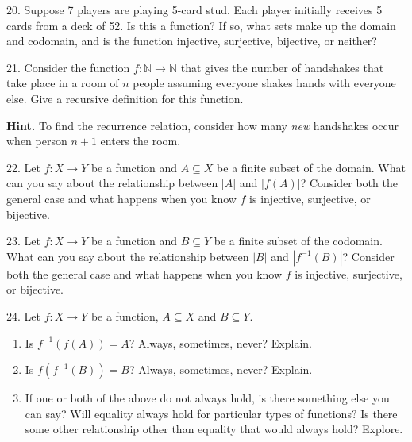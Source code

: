 \documentclass[10pt,]{book}
\theoremstyle{plain}
\theoremstyle{definition}
\theoremstyle{definition}
\numberwithin{equation}{chapter}
\newcommand{\N}{\mathbb N}
\newcommand{\inv}{^{-1}}
\newcommand{\card}[1]{\left| #1 \right|}
\begin{document}
\begin{exerciselist}
\item[20.]\hypertarget{exercise-66}{}\hypertarget{p-806}{}%
Suppose 7 players are playing 5-card stud. Each player initially receives 5 cards from a deck of 52. Is this a function? If so, what sets make up the domain and codomain, and is the function injective, surjective, bijective, or neither?%
\par\smallskip
\item[21.]\hypertarget{exercise-67}{}\hypertarget{p-808}{}%
Consider the function \(f:\N \to \N\) that gives the number of handshakes that take place in a room of \(n\) people assuming everyone shakes hands with everyone else.  Give a recursive definition for this function.%
\par\smallskip
\par\smallskip%
\noindent\textbf{Hint.}\hypertarget{hint-5}{}\quad%
\hypertarget{p-809}{}%
To find the recurrence relation, consider how many \emph{new} handshakes occur when person \(n+1\) enters the room.%
\item[22.]\hypertarget{exercise-68}{}\hypertarget{p-812}{}%
Let \(f:X \to Y\) be a function and \(A \subseteq X\) be a finite subset of the domain.  What can you say about the relationship between \(\card{A}\) and \(\card{f(A)}\)?  Consider both the general case and what happens when you know \(f\) is injective, surjective, or bijective.%
\par\smallskip
\item[23.]\hypertarget{exercise-69}{}\hypertarget{p-814}{}%
Let \(f:X \to Y\) be a function and \(B \subseteq Y\) be a finite subset of the codomain.  What can you say about the relationship between \(\card{B}\) and \(\card{f\inv(B)}\)?  Consider both the general case and what happens when you know \(f\) is injective, surjective, or bijective.%
\par\smallskip
\item[24.]\hypertarget{exercise-70}{}\hypertarget{p-817}{}%
Let \(f:X \to Y\) be a function, \(A \subseteq X\) and \(B \subseteq Y\). \leavevmode%
\begin{enumerate}[label=(\alph*)]
\item\hypertarget{li-533}{}\hypertarget{p-818}{}%
Is \(f\inv\left(f(A)\right) = A\)?  Always, sometimes, never?  Explain.%
\item\hypertarget{li-534}{}\hypertarget{p-819}{}%
Is \(f\left(f\inv(B)\right) = B\)?  Always, sometimes, never?  Explain.%
\item\hypertarget{li-535}{}\hypertarget{p-820}{}%
If one or both of the above do not always hold, is there something else you can say?  Will equality always hold for particular types of functions?  Is there some other relationship other than equality that would always hold?  Explore.%

\end{enumerate}
\end{exerciselist}
\end{document}
